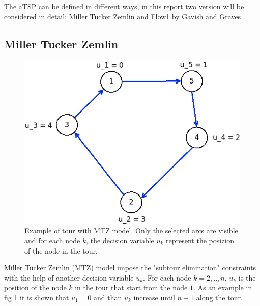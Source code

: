The aTSP can be defined in different ways, in this report two version will be considered in detail: Miller Tucker Zemlin \cite{miller1960integer} and Flow1 by Gavish and Graves \cite{gavish1978travelling}.


\subsection{Miller Tucker Zemlin}

\begin{figure}[h]
	\centering
	\includegraphics[width=.45\columnwidth]{img/asymTSP_MTZ_example.png}
	\caption{Example of tour with MTZ model. Only the selected arcs are visible and for each node $ k $, the decision variable $ u_k $ represent the posizion of the node in the tour.}
	\label{fig:asymTSP_MTZ}
\end{figure}

Miller Tucker Zemlin (MTZ) model impose the "subtour elimination" constraints with the help of another decision variable $ u_k $. For each node $ k = 2,..,n $, $ u_k $ is the position of the node $ k $ in the tour that start from the node $ 1 $. As an example in fig \ref{fig:asymTSP_MTZ} it is shown that $ u_1 = 0 $ and than $ u_k $ increase until $ n-1 $ along the tour.

